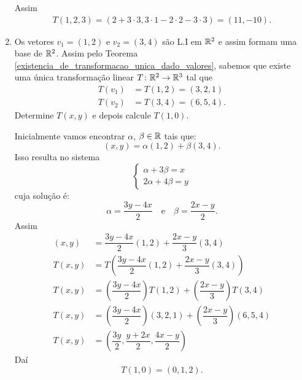 \begin{exemplos}
\begin{enumerate}[label={\arabic*})]
\begin{solucao}
            Assim
            \begin{align*}
                T(1, 2, 3) = (2 + 3\cdot3, 3\cdot 1 - 2 \cdot 2 - 3 \cdot 3) = (11, -10).
            \end{align*}
        \end{solucao}
        \item Os vetores $v_1 = (1,2)$ e $v_2 = (3,4)$ s\~ao L.I em $\mathbb{R}^2$ e assim formam uma base de $\mathbb{R}^2$. Assim pelo Teorema \ref{existencia_de_transformacao_unica_dado_valores}, sabemos que existe uma \'unica transforma\c{c}\~ao linear $T \colon \mathbb{R}^2 \to \mathbb{R}^3$ tal que
        \begin{align*}
            T(v_1) &= T(1,2) = (3,2,1)\\
            T(v_2) &= T(3,4) = (6,5,4).
        \end{align*}
        Determine  $T(x, y)$ e depois calcule $T(1,0)$.
        \begin{solucao}
            Inicialmente vamos encontrar $\alpha$, $\beta \in \mathbb{R}$ tais que:
            \[
              (x, y) = \alpha(1,2) + \beta(3,4).
            \]
            Isso resulta no sistema
            \[
              \begin{cases}
                \alpha + 3\beta = x\\
                2\alpha + 4\beta = y
              \end{cases}
            \]
            cuja solu\c{c}ão é:
            \[
              \alpha = \dfrac{3y - 4x}{2}\quad \mbox{e}\quad \beta = \dfrac{2x - y}{2}.
            \]
            Assim
            \begin{align*}
              (x, y) &= \dfrac{3y - 4x}{2}(1, 2) + \dfrac{2x - y}{3}(3, 4)\\
              T(x, y) &= T\left(\dfrac{3y - 4x}{2}(1, 2) + \dfrac{2x - y}{3}(3, 4)\right)\\
              T(x, y) &= \left(\dfrac{3y - 4x}{2}\right)T(1, 2) + \left(\dfrac{2x - y}{3}\right)T(3, 4)\\
              T(x, y) &= \left(\dfrac{3y - 4x}{2}\right)(3, 2, 1) + \left(\dfrac{2x - y}{3}\right)(6, 5, 4)\\
              T(x, y) &= \left(\dfrac{3y}{2}, \dfrac{y + 2x}{2}, \dfrac{4x - y}{2}\right)
            \end{align*}
            Daí
            \[
              T(1,0) =(0,1,2).
            \]
        \end{solucao}
    \end{enumerate}
\end{exemplos}

